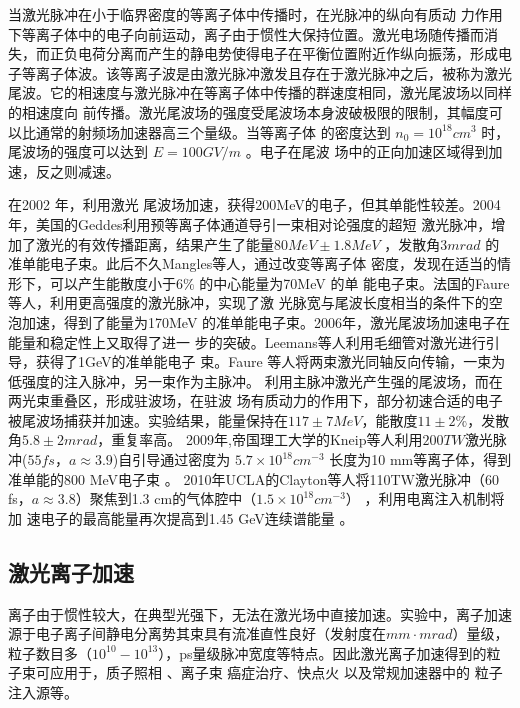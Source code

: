 当激光脉冲在小于临界密度的等离子体中传播时，在光脉冲的纵向有质动
力作用下等离子体中的电子向前运动，离子由于惯性大保持位置。激光电场随传播而消失，而正负电荷分离而产生的静电势使得电子在平衡位置附近作纵向振荡，形成电子等离子体波。该等离子波是由激光脉冲激发且存在于激光脉冲之后，被称为激光尾波。它的相速度与激光脉冲在等离子体中传播的群速度相同，激光尾波场以同样的相速度向
前传播。激光尾波场的强度受尾波场本身波破极限的限制，其幅度可以比通常的射频场加速器高三个量级。当等离子体
的密度达到 $n_0=10^{18} {cm}^3$ 时，尾波场的强度可以达到 $E =100 GV / m$ 。电子在尾波
场中的正向加速区域得到加速，反之则减速。

在2002 年，利用激光
尾波场加速，获得200MeV的电子\cite{malka2002electron}，但其单能性较差。2004年，美国的Geddes\cite{geddes2004high}利用预等离子体通道导引一束相对论强度的超短
激光脉冲，增加了激光的有效传播距离，结果产生了能量$80MeV \pm 1.8MeV$ ，发散角$3mrad$ 的准单能电子束。此后不久Mangles等人\cite{mangles2004monoenergetic}，通过改变等离子体
密度，发现在适当的情形下，可以产生能散度小于$6\%$ 的中心能量为70MeV 的单
能电子束。法国的Faure等人\cite{faure2004laser}，利用更高强度的激光脉冲，实现了激
光脉宽与尾波长度相当的条件下的空泡加速，得到了能量为170MeV
的准单能电子束。2006年，激光尾波场加速电子在能量和稳定性上又取得了进一
步的突破。Leemans等人利用毛细管对激光进行引导，获得了1GeV的准单能电子
束\cite{leemans2006gev}。Faure
等人\cite{faure2006controlled}将两束激光同轴反向传输，一束为低强度的注入脉冲，另一束作为主脉冲。
利用主脉冲激光产生强的尾波场，而在两光束重叠区，形成驻波场，在驻波
场有质动力的作用下，部分初速合适的电子被尾波场捕获并加速。实验结果，能量保持在$117 \pm 7MeV$，能散度$11
\pm 2\%$，发散角$5.8 \pm 2mrad$，重复率高。
2009年,帝国理工大学的Kneip等人利用$200TW$激光脉冲($55fs$，$a  \approx 3.9$)自引导通过密度为 $5.7 \times10^{18} cm^{-3}$ 长度为10 mm等离子体，得到准单能的800 MeV电子束 \cite{kneip2009near}。 2010年UCLA的Clayton等人将110TW激光脉冲（60
fs，$a \approx 3.8$）聚焦到1.3 cm的气体腔中（$1.5 \times 10^{18} cm^{-3}$）
，利用电离注入机制将加
速电子的最高能量再次提高到1.45 GeV连续谱能量 \cite{clayton2010self}。



\subsection{激光离子加速}

离子由于惯性较大，在典型光强下，无法在激光场中直接加速。实验中，离子加速源于电子离子间静电分离势其束具有流准直性良好（发射度在$mm \cdot mrad$）量级，粒子数目多（$10^{10}-{10}^{13} 
$），ps量级脉冲宽度等特点。因此激光离子加速得到的粒子束可应用于，质子照相 \cite{borghesi2002macroscopic,romagnani2005dynamics}、离子束
癌症治疗\cite{malka2004practicability,bulanov2002feasibility}、快点火\cite{roth2001fast} 以及常规加速器中的
粒子注入源\cite{haseroth1996physical}等。







